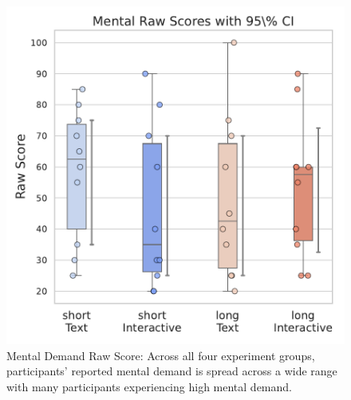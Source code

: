 



\begin{figure}[h]
    \begin{minipage}[t]{0.45\textwidth}
        \centering
        \includegraphics[width=\textwidth, trim=0 13 0 13, clip]{content/image/cog/Mental_scores.pdf}
        \captionsetup{width=0.9\textwidth, justification=justified}
        \caption{Mental Demand Raw Score: Across all four experiment groups, participants' reported mental demand is spread across a wide range with many participants experiencing high mental demand.}
        \label{fig:mental_cog_score}
    \end{minipage}
    \hfill
    \begin{minipage}[t]{0.45\textwidth}
        \centering

\end{minipage}
\end{figure}
